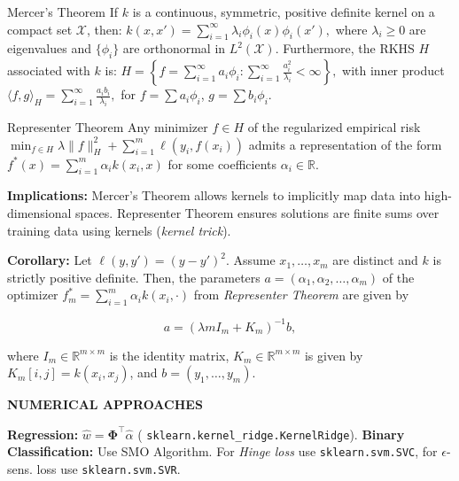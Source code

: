 \documentclass[a4paper,10pt]{article}
\newcommand{\subtitle}[1]{\vspace{0.25cm}\begin{normalsize}\textbf{\textcolor{gray!150}{\uppercase{#1}}}\end{normalsize}}
\begin{document}
\begin{small}
\begin{subbox}{Mercer's Theorem}
    If $k$ is a continuous, symmetric, positive definite kernel on a compact set $\mathcal{X}$, then:
    $
    k(x, x') = \sum_{i=1}^\infty \lambda_i \phi_i(x) \phi_i(x'),
    $
    where $\lambda_i \geq 0$ are eigenvalues and $\{\phi_i\}$ are orthonormal in $L^2(\mathcal{X})$. Furthermore, the RKHS $H$ associated with $k$ is:
    $
    H = \left\{ f = \sum_{i=1}^\infty a_i \phi_i : \sum_{i=1}^\infty \frac{a_i^2}{\lambda_i} < \infty \right\},
    $
    with inner product
    $
    \langle f, g \rangle_H = \sum_{i=1}^\infty \frac{a_i b_i}{\lambda_i},
    $
    for $f = \sum a_i \phi_i$, $g = \sum b_i \phi_i$.
\end{subbox}

\begin{subbox}{Representer Theorem}
    Any minimizer $f \in H$ of the regularized empirical risk
    $
    \min_{f \in H} \lambda \|f\|_H^2 + \sum_{i=1}^{m} \ell(y_i, f(x_i))
    $
    admits a representation of the form
    $
    f^*(x) = \sum_{i=1}^{m} \alpha_i k(x_i, x)
    $
    for some coefficients $\alpha_i \in \mathbb{R}$.
\end{subbox}

\textbf{Implications:} Mercer's Theorem allows kernels to implicitly map data into high-dimensional spaces. Representer Theorem ensures solutions are finite sums over training data using kernels (\textit{kernel trick}).

\textbf{Corollary:} Let $\ell(y, y') = (y - y')^2$. Assume $x_1, \dots, x_m$ are distinct and $k$ is strictly positive definite. Then, the parameters $a = (\alpha_1, \alpha_2, \dots, \alpha_m)$ of the optimizer $f_m^* = \sum_{i=1}^{m} \alpha_i k(x_i, \cdot)$ from \textit{Representer Theorem} are given by

\[
a = (\lambda m I_m + K_m)^{-1} b,
\]

where $I_m \in \mathbb{R}^{m \times m}$ is the identity matrix, $K_m \in \mathbb{R}^{m \times m}$ is given by $K_m[i,j] = k(x_i, x_j)$, and $b = (y_1, \dots, y_m)$.

\subtitle{Numerical approaches}

\textbf{Regression:} $\hat{w} = \mathbf{\Phi}^\top \hat{\alpha}$ ( \texttt{sklearn.kernel\_ridge.KernelRidge}).
\textbf{Binary Classification:} Use SMO Algorithm. For \textit{Hinge loss} use \texttt{sklearn.svm.SVC}, for $\epsilon$-sens. loss use \texttt{sklearn.svm.SVR}. 


\end{small}
\end{document}
